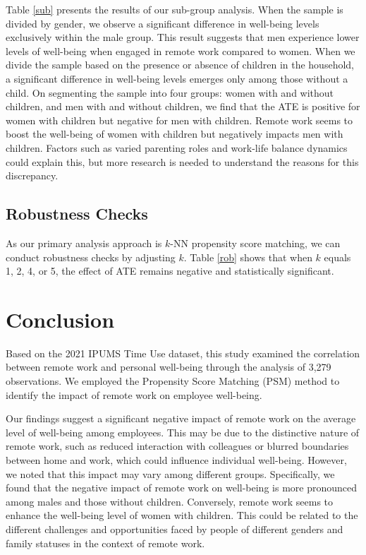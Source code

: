 \documentclass[12pt]{article}
\begin{document}
Table \ref{sub} presents the results of our sub-group analysis. When the sample is divided by gender, we observe a significant difference in well-being levels exclusively within the male group. This result suggests that men experience lower levels of well-being when engaged in remote work compared to women. When we divide the sample based on the presence or absence of children in the household, a significant difference in well-being levels emerges only among those without a child. On segmenting the sample into four groups: women with and without children, and men with and without children, we find that the ATE is positive for women with children but negative for men with children. Remote work seems to boost the well-being of women with children but negatively impacts men with children. Factors such as varied parenting roles and work-life balance dynamics could explain this, but more research is needed to understand the reasons for this discrepancy.


\subsection{Robustness Checks}
As our primary analysis approach is $k$-NN propensity score matching, we can conduct robustness checks by adjusting $k$. Table \ref{rob} shows that when $k$ equals 1, 2, 4, or 5, the effect of ATE remains negative and statistically significant.


\section{Conclusion}\label{conclusion}

Based on the 2021 IPUMS Time Use dataset, this study examined the correlation between remote work and personal well-being through the analysis of 3,279 observations. We employed the Propensity Score Matching (PSM) method to identify the impact of remote work on employee well-being.

Our findings suggest a significant negative impact of remote work on the average level of well-being among employees. This may be due to the distinctive nature of remote work, such as reduced interaction with colleagues or blurred boundaries between home and work, which could influence individual well-being. However, we noted that this impact may vary among different groups. Specifically, we found that the negative impact of remote work on well-being is more pronounced among males and those without children. Conversely, remote work seems to enhance the well-being level of women with children. This could be related to the different challenges and opportunities faced by people of different genders and family statuses in the context of remote work.
\end{document}
